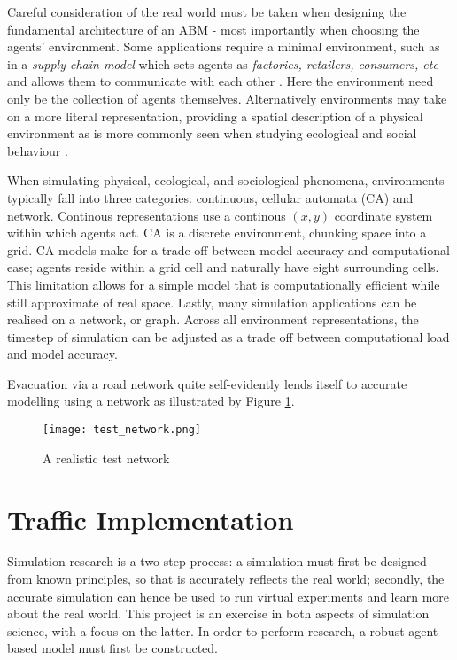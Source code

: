Careful consideration of the real world must be taken when designing the fundamental architecture of an ABM - most importantly when choosing the agents' environment. Some applications require a minimal environment, such as in a \textit{supply chain model} which sets agents as \textit{factories, retailers, consumers, etc} and allows them to communicate with each other \cite{Macal2006TutorialAgents}. Here the environment need only be the collection of agents themselves. Alternatively environments may take on a more literal representation, providing a spatial description of a physical environment as is more commonly seen when studying ecological and social behaviour \cite{Macal2005TutorialSimulation}.

When simulating physical, ecological, and sociological phenomena, environments typically fall into three categories: continuous, cellular automata (CA) and network. Continous representations use a continous $(x,y)$ coordinate system within which agents act. CA is a discrete environment, chunking space into a grid. CA models make for a trade off between model accuracy and computational ease; agents reside within a grid cell and naturally have eight surrounding cells. This limitation allows for a simple model that is computationally efficient while still approximate of real space. Lastly, many simulation applications can be realised on a network, or graph. Across all environment representations, the timestep of simulation can be adjusted as a trade off between computational load and model accuracy.


Evacuation via a road network quite self-evidently lends itself to accurate modelling using a network as illustrated by Figure \ref{fig:test_network}.

\begin{figure}
    \centering
    \texttt{[image: test\_network.png]}
    \caption{A realistic test network \cite{Zhang2009Agent-basedEvacuation}}
    \label{fig:test_network}
\end{figure}

\section{Traffic Implementation}

Simulation research is a two-step process: a simulation must first be designed from known principles, so that is accurately reflects the real world; secondly, the accurate simulation can hence be used to run virtual experiments and learn more about the real world. This project is an exercise in both aspects of simulation science, with a focus on the latter. In order to perform research, a robust agent-based model must first be constructed.

